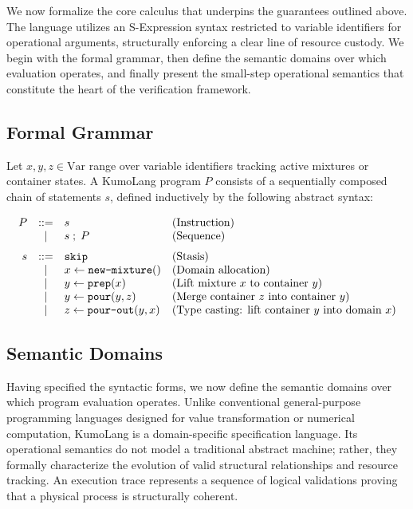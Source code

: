 \documentclass[11pt, a4paper]{article}
\begin{document}
We now formalize the core calculus that underpins the guarantees outlined above. The language utilizes an S-Expression syntax restricted to variable identifiers for operational arguments, structurally enforcing a clear line of resource custody. We begin with the formal grammar, then define the semantic domains over which evaluation operates, and finally present the small-step operational semantics that constitute the heart of the verification framework.
\subsection{Formal Grammar}
Let $x, y, z \in \text{Var}$ range over variable identifiers tracking active mixtures or container states. A KumoLang program $P$ consists of a sequentially composed chain of statements $s$, defined inductively by the following abstract syntax:

\[
\begin{array}{rcll}
P & ::= & s & \text{(Instruction)} \\
  & \mid  & s \;;\; P & \text{(Sequence)} \\
[1.5ex]
s & ::= & \text{\texttt{skip}} & \text{(Stasis)} \\
  & \mid  & x \leftarrow \text{\texttt{new-mixture}}() & \text{(Domain allocation)} \\
  & \mid  & y \leftarrow \text{\texttt{prep}}(x) & \text{(Lift mixture $x$ to container $y$)} \\
  & \mid  & y \leftarrow \text{\texttt{pour}}(y, z) & \text{(Merge container $z$ into container $y$)} \\
  & \mid  & z \leftarrow \text{\texttt{pour-out}}(y, x) & \text{(Type casting: lift container $y$ into domain $x$)} \\
\end{array}
\]


\subsection{Semantic Domains}
Having specified the syntactic forms, we now define the semantic domains over which program evaluation operates. Unlike conventional general-purpose programming languages designed for value transformation or numerical computation, KumoLang is a domain-specific specification language. Its operational semantics do not model a traditional abstract machine; rather, they formally characterize the evolution of valid structural relationships and resource tracking. An execution trace represents a sequence of logical validations proving that a physical process is structurally coherent.
\end{document}

